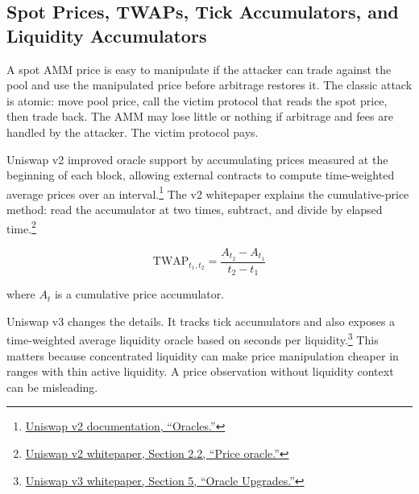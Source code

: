 \subsection{Spot Prices, TWAPs, Tick Accumulators, and Liquidity Accumulators}

A spot AMM price is easy to manipulate if the attacker can trade against the pool and use the manipulated price before arbitrage restores it. The classic attack is atomic: move pool price, call the victim protocol that reads the spot price, then trade back. The AMM may lose little or nothing if arbitrage and fees are handled by the attacker. The victim protocol pays.

Uniswap v2 improved oracle support by accumulating prices measured at the beginning of each block, allowing external contracts to compute time-weighted average prices over an interval.\footnote{\href{https://developers.uniswap.org/docs/protocols/v2/concepts/oracles}{Uniswap v2 documentation, ``Oracles.''}} The v2 whitepaper explains the cumulative-price method: read the accumulator at two times, subtract, and divide by elapsed time.\footnote{\href{https://app.uniswap.org/whitepaper.pdf}{Uniswap v2 whitepaper, Section 2.2, ``Price oracle.''}}

\[
    \mathrm{TWAP}_{t_1,t_2}
    =
    \frac{A_{t_2} - A_{t_1}}{t_2 - t_1}
\]

where \(A_t\) is a cumulative price accumulator.

Uniswap v3 changes the details. It tracks tick accumulators and also exposes a time-weighted average liquidity oracle based on seconds per liquidity.\footnote{\href{https://app.uniswap.org/whitepaper-v3.pdf}{Uniswap v3 whitepaper, Section 5, ``Oracle Upgrades.''}} This matters because concentrated liquidity can make price manipulation cheaper in ranges with thin active liquidity. A price observation without liquidity context can be misleading.

